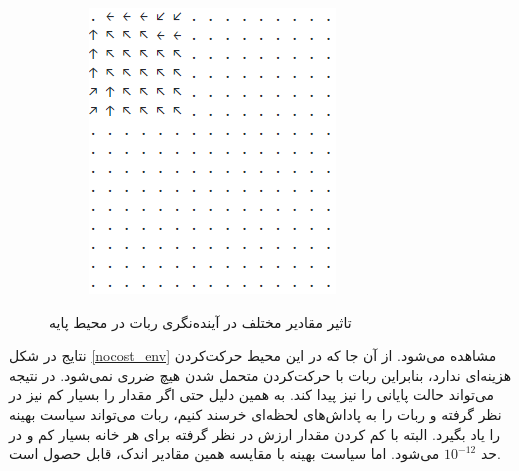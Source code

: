 \documentclass[12pt, a4paper]{article}
\begin{document}
\begin{figure}[h]
\begin{subfigure}{0.45\linewidth}
        \caption{}
    \end{subfigure}
    \hfill
    \begin{subfigure}{0.45\linewidth}
        \centering
        \includegraphics[width=\linewidth]{images/q4/d/base/discount_01.png}
        \caption{}
    \end{subfigure}
    \caption{تاثیر مقادیر مختلف  در آینده‌نگری ربات در محیط پایه}
    \label{base_env}
\end{figure}

\clearpage

نتایج در شکل \ref{nocost_env} مشاهده می‌شود. از آن جا که در این محیط حرکت‌کردن هزینه‌ای ندارد،
بنابراین ربات با حرکت‌کردن متحمل شدن هیچ ضرری نمی‌شود. در نتیجه می‌تواند حالت پایانی
را نیز پیدا کند. به همین دلیل حتی اگر مقدار  را بسیار کم نیز در نظر گرفته و ربات را به
پاداش‌های لحظه‌ای خرسند کنیم، ربات می‌تواند سیاست بهینه را یاد بگیرد. البته با کم کردن مقدار 
ارزش در نظر گرفته برای هر خانه بسیار کم و در حد $10^{-12}$ می‌شود. اما سیاست بهینه با مقایسه همین مقادیر
اندک، قابل حصول است.
\end{document}
